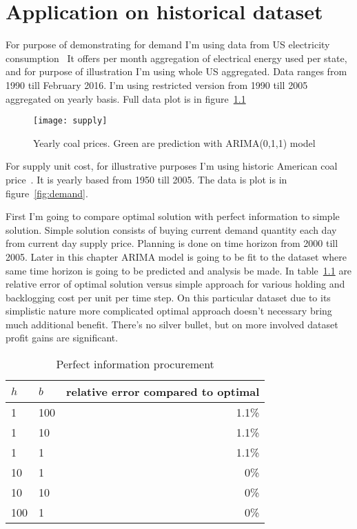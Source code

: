 
\chapter{Application on historical dataset}
\label{chap:Application on historical dataset}

For purpose of demonstrating for demand I'm using data from US electricity consumption~\cite{us-elec} It offers per month aggregation of electrical energy used per state, and for purpose of illustration I'm using whole US aggregated. Data ranges from 1990 till February 2016. I'm using restricted version from 1990 till 2005 aggregated on yearly basis. Full data plot is in figure~\ref{fig:supply}

\begin{figure}[]
  \centering
  \texttt{[image: supply]}
  \caption{Yearly coal prices. Green are prediction with ARIMA(0,1,1) model}
  \label{fig:supply}
\end{figure}

For supply unit cost, for illustrative purposes I'm using historic American coal price~\cite{us-coal}. It is yearly based from 1950 till 2005. The data is plot is in figure~\ref{fig:demand}.

First I'm going to compare optimal solution with perfect information to simple solution. Simple solution consists of buying current demand quantity each day from current day supply price. Planning is done on time horizon from 2000 till 2005. Later in this chapter ARIMA model is going to be fit to the dataset where same time horizon is going to be predicted and analysis be made. In table~\ref{my-label} are relative error of optimal solution versus simple approach for various holding and backlogging cost per unit per time step. On this particular dataset due to its simplistic nature more complicated optimal approach doesn't necessary bring much additional benefit. There's no silver bullet, but on more involved dataset profit gains are significant.

\begin{table}[]
\centering
\caption{Perfect information procurement}
\label{my-label}
\begin{tabular}{@{}llr@{}}
\toprule
$h$ & $b$ & relative error compared to optimal \\ \midrule
1   & 100 & 1.1\%          \\
1   & 10  & 1.1\%          \\
1   & 1   & 1.1\%          \\
10  & 1   & 0\%            \\
10  & 10  & 0\%            \\
100 & 1   & 0\%            \\ \bottomrule
\end{tabular}
\end{table}


